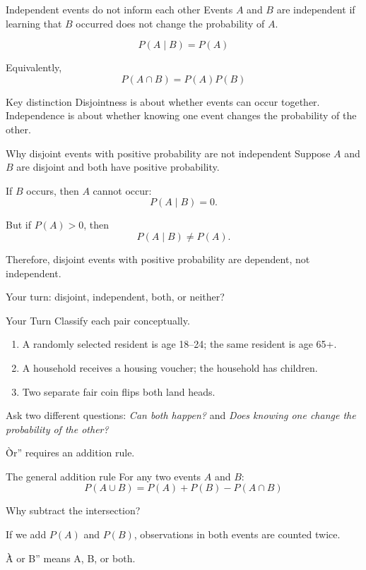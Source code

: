 \documentclass[11pt,aspectratio=169]{beamer}
\newcommand{\yourturn}[1]{%
\begin{center}
\begin{minipage}{0.90\textwidth}
\begin{alertblock}{Your Turn}
#1
\end{alertblock}
\end{minipage}
\end{center}}
\newcommand{\prob}[1]{P\!\left(#1\right)}
\newcommand{\condprob}[2]{P\!\left(#1\mid #2\right)}
\begin{document}
\begin{frame}{Independent events do not inform each other}
Events $A$ and $B$ are \alert{independent} if learning that $B$ occurred does not change the probability of $A$.

\[
\boxed{\condprob{A}{B}=\prob{A}}
\]

Equivalently,
\[
\boxed{\prob{A\cap B}=\prob{A}\prob{B}}
\]

\vfill
\begin{alertblock}{Key distinction}
Disjointness is about whether events can occur together. Independence is about whether knowing one event changes the probability of the other.
\end{alertblock}
\end{frame}

\begin{frame}{Why disjoint events with positive probability are not independent}
Suppose $A$ and $B$ are disjoint and both have positive probability.

If $B$ occurs, then $A$ cannot occur:
\[
\condprob{A}{B}=0.
\]

But if $\prob{A}>0$, then
\[
\condprob{A}{B}\neq \prob{A}.
\]

\vfill
Therefore, disjoint events with positive probability are \alert{dependent}, not independent.
\end{frame}

\begin{frame}{Your turn: disjoint, independent, both, or neither?}
\yourturn{Classify each pair conceptually.
\begin{enumerate}
  \item A randomly selected resident is age 18--24; the same resident is age 65+.
  \item A household receives a housing voucher; the household has children.
  \item Two separate fair coin flips both land heads.
\end{enumerate}}

\vfill
\small
Ask two different questions: \emph{Can both happen?} and \emph{Does knowing one change the probability of the other?}
\end{frame}

\begin{frame}[standout]
\Large \`\`Or'' requires an addition rule.
\end{frame}

\begin{frame}{The general addition rule}
For any two events $A$ and $B$:
\[
\boxed{\prob{A\cup B}=\prob{A}+\prob{B}-\prob{A\cap B}}
\]

Why subtract the intersection?

\vspace{0.4em}
If we add $\prob{A}$ and $\prob{B}$, observations in both events are counted twice.

\vfill
\alert{\`\`A or B'' means A, B, or both.}
\end{frame}
\end{document}
